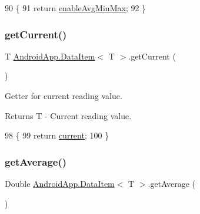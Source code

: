 \begin{DoxyCode}
90                                          \{
91         \textcolor{keywordflow}{return} \hyperlink{class_android_app_1_1_data_item_a330d3ade00b732f202d73dbb0d3b711f}{enableAvgMinMax};
92     \}
\end{DoxyCode}
\mbox{\label{class_android_app_1_1_data_item_aee0b56933fb8673f7b6e52cde9da157c}} 
\subsubsection{\texorpdfstring{get\+Current()}{getCurrent()}}
{\footnotesize\ttfamily T \hyperlink{class_android_app_1_1_data_item}{Android\+App.\+Data\+Item}$<$ T $>$.get\+Current (\begin{DoxyParamCaption}{ }\end{DoxyParamCaption})\hspace{0.3cm}{\ttfamily [inline]}}



Getter for current reading value. 

\begin{DoxyReturn}{Returns}
T -\/ Current reading value. 
\end{DoxyReturn}

\begin{DoxyCode}
98                           \{
99         \textcolor{keywordflow}{return} \hyperlink{class_android_app_1_1_data_item_aef9fad1dca931e60708187ab89769f54}{current};
100     \}
\end{DoxyCode}
\mbox{\label{class_android_app_1_1_data_item_ad3b598a42bc7e38aa46d5091a752a47b}} 
\subsubsection{\texorpdfstring{get\+Average()}{getAverage()}}
{\footnotesize\ttfamily Double \hyperlink{class_android_app_1_1_data_item}{Android\+App.\+Data\+Item}$<$ T $>$.get\+Average (\begin{DoxyParamCaption}{ }\end{DoxyParamCaption})\hspace{0.3cm}{\ttfamily [inline]}}



